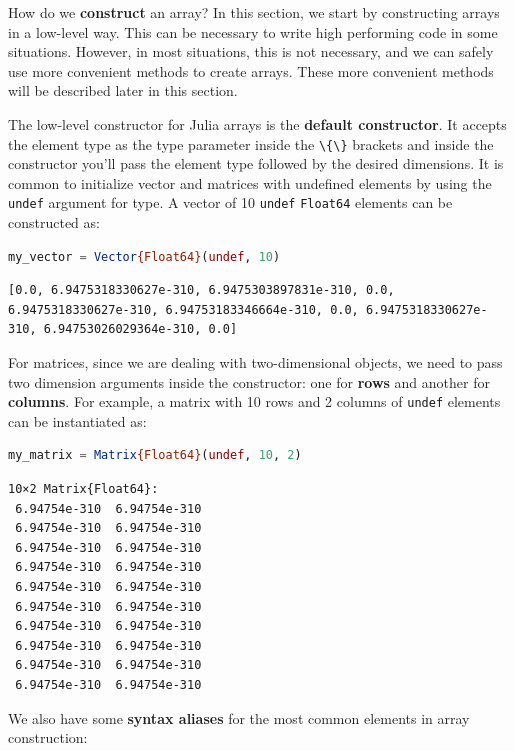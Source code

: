 \documentclass[
  notoc %
]{tufte-book}
\newcommand{\passthrough}[1]{#1}
\begin{document}
How do we \textbf{construct} an array? In this section, we start by
constructing arrays in a low-level way. This can be necessary to write
high performing code in some situations. However, in most situations,
this is not necessary, and we can safely use more convenient methods to
create arrays. These more convenient methods will be described later in
this section.

The low-level constructor for Julia arrays is the \textbf{default
constructor}. It accepts the element type as the type parameter inside
the \passthrough{\lstinline!\{\}!} brackets and inside the constructor
you'll pass the element type followed by the desired dimensions. It is
common to initialize vector and matrices with undefined elements by
using the \passthrough{\lstinline!undef!} argument for type. A vector of
10 \passthrough{\lstinline!undef!} \passthrough{\lstinline!Float64!}
elements can be constructed as:

\begin{lstlisting}[language=Julia]
my_vector = Vector{Float64}(undef, 10)
\end{lstlisting}

\begin{lstlisting}[language=Output]
[0.0, 6.9475318330627e-310, 6.9475303897831e-310, 0.0, 6.9475318330627e-310, 6.94753183346664e-310, 0.0, 6.9475318330627e-310, 6.94753026029364e-310, 0.0]
\end{lstlisting}

For matrices, since we are dealing with two-dimensional objects, we need
to pass two dimension arguments inside the constructor: one for
\textbf{rows} and another for \textbf{columns}. For example, a matrix
with 10 rows and 2 columns of \passthrough{\lstinline!undef!} elements
can be instantiated as:

\begin{lstlisting}[language=Julia]
my_matrix = Matrix{Float64}(undef, 10, 2)
\end{lstlisting}

\begin{lstlisting}[language=Output]
10×2 Matrix{Float64}:
 6.94754e-310  6.94754e-310
 6.94754e-310  6.94754e-310
 6.94754e-310  6.94754e-310
 6.94754e-310  6.94754e-310
 6.94754e-310  6.94754e-310
 6.94754e-310  6.94754e-310
 6.94754e-310  6.94754e-310
 6.94754e-310  6.94754e-310
 6.94754e-310  6.94754e-310
 6.94754e-310  6.94754e-310
\end{lstlisting}

We also have some \textbf{syntax aliases} for the most common elements
in array construction:
\end{document}

